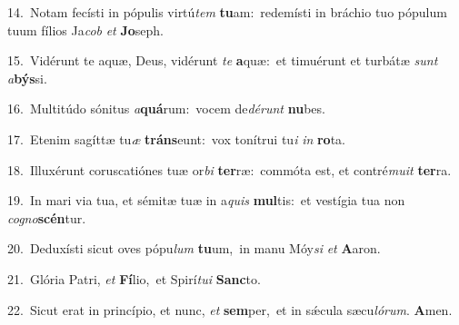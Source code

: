 {\numbfont\textcolor{\numbcolor}{14.}}~Notam fecísti in pópulis virtú\textit{tem} \textbf{tu}\-am:~\star redemísti in bráchio tuo pópulum tuum fílios Ja\textit{cob} \textit{et} \textbf{Jo}\-seph.\par
{\numbfont\textcolor{\numbcolor}{15.}}~Vidérunt te aquæ, Deus, vidérunt \textit{te} \textbf{a}\-quæ:~\star et timuérunt et turbátæ \textit{sunt} \textit{a}\-\textbf{býs}si.\par
{\numbfont\textcolor{\numbcolor}{16.}}~Multitúdo sónitus \textit{a}\-\textbf{quá}rum:~\star vocem de\-\textit{dé}\-\textit{runt} \textbf{nu}\-bes.\par
{\numbfont\textcolor{\numbcolor}{17.}}~Etenim sagíttæ tu\textit{æ} \textbf{tráns}\-eunt:~\star vox tonítrui tu\textit{i} \textit{in} \textbf{ro}\-ta.\par
{\numbfont\textcolor{\numbcolor}{18.}}~Illuxérunt coruscatiónes tuæ or\textit{bi} \textbf{ter}\-ræ:~\star commóta est, et contré\-\textit{mu}\-\textit{it} \textbf{ter}\-ra.\par
{\numbfont\textcolor{\numbcolor}{19.}}~In mari via tua, et sémitæ tuæ in a\textit{quis} \textbf{mul}\-tis:~\star et vestígia tua non \textit{co}\-\textit{gno}\textbf{scén}tur.\par
{\numbfont\textcolor{\numbcolor}{20.}}~Deduxísti sicut oves pópu\textit{lum} \textbf{tu}\-um,~\star in manu Móy\textit{si} \textit{et} \textbf{A}\-aron.\par
{\numbfont\textcolor{\numbcolor}{21.}}~Glória Patri, \textit{et} \textbf{Fí}\-lio,~\star et Spirí\-\textit{tu}\-\textit{i} \textbf{Sanc}\-to.\par
{\numbfont\textcolor{\numbcolor}{22.}}~Sicut erat in princípio, et nunc, \textit{et} \textbf{sem}\-per,~\star et in sǽcula sæcu\-\textit{ló}\-\textit{rum}. \textbf{A}\-men.\par
